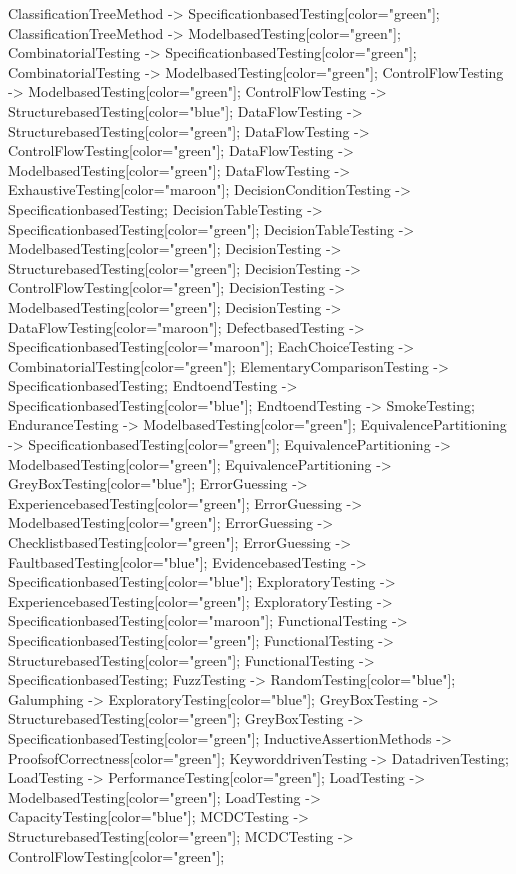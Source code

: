 \documentclass{article}
\begin{document}
{ClassificationTreeMethod -> SpecificationbasedTesting[color="green"];
ClassificationTreeMethod -> ModelbasedTesting[color="green"];
CombinatorialTesting -> SpecificationbasedTesting[color="green"];
CombinatorialTesting -> ModelbasedTesting[color="green"];
ControlFlowTesting -> ModelbasedTesting[color="green"];
ControlFlowTesting -> StructurebasedTesting[color="blue"];
DataFlowTesting -> StructurebasedTesting[color="green"];
DataFlowTesting -> ControlFlowTesting[color="green"];
DataFlowTesting -> ModelbasedTesting[color="green"];
DataFlowTesting -> ExhaustiveTesting[color="maroon"];
DecisionConditionTesting -> SpecificationbasedTesting;
DecisionTableTesting -> SpecificationbasedTesting[color="green"];
DecisionTableTesting -> ModelbasedTesting[color="green"];
DecisionTesting -> StructurebasedTesting[color="green"];
DecisionTesting -> ControlFlowTesting[color="green"];
DecisionTesting -> ModelbasedTesting[color="green"];
DecisionTesting -> DataFlowTesting[color="maroon"];
DefectbasedTesting -> SpecificationbasedTesting[color="maroon"];
EachChoiceTesting -> CombinatorialTesting[color="green"];
ElementaryComparisonTesting -> SpecificationbasedTesting;
EndtoendTesting -> SpecificationbasedTesting[color="blue"];
EndtoendTesting -> SmokeTesting;
EnduranceTesting -> ModelbasedTesting[color="green"];
EquivalencePartitioning -> SpecificationbasedTesting[color="green"];
EquivalencePartitioning -> ModelbasedTesting[color="green"];
EquivalencePartitioning -> GreyBoxTesting[color="blue"];
ErrorGuessing -> ExperiencebasedTesting[color="green"];
ErrorGuessing -> ModelbasedTesting[color="green"];
ErrorGuessing -> ChecklistbasedTesting[color="green"];
ErrorGuessing -> FaultbasedTesting[color="blue"];
EvidencebasedTesting -> SpecificationbasedTesting[color="blue"];
ExploratoryTesting -> ExperiencebasedTesting[color="green"];
ExploratoryTesting -> SpecificationbasedTesting[color="maroon"];
FunctionalTesting -> SpecificationbasedTesting[color="green"];
FunctionalTesting -> StructurebasedTesting[color="green"];
FunctionalTesting -> SpecificationbasedTesting;
FuzzTesting -> RandomTesting[color="blue"];
Galumphing -> ExploratoryTesting[color="blue"];
GreyBoxTesting -> StructurebasedTesting[color="green"];
GreyBoxTesting -> SpecificationbasedTesting[color="green"];
InductiveAssertionMethods -> ProofsofCorrectness[color="green"];
KeyworddrivenTesting -> DatadrivenTesting;
LoadTesting -> PerformanceTesting[color="green"];
LoadTesting -> ModelbasedTesting[color="green"];
LoadTesting -> CapacityTesting[color="blue"];
MCDCTesting -> StructurebasedTesting[color="green"];
MCDCTesting -> ControlFlowTesting[color="green"];
}
\end{document}
